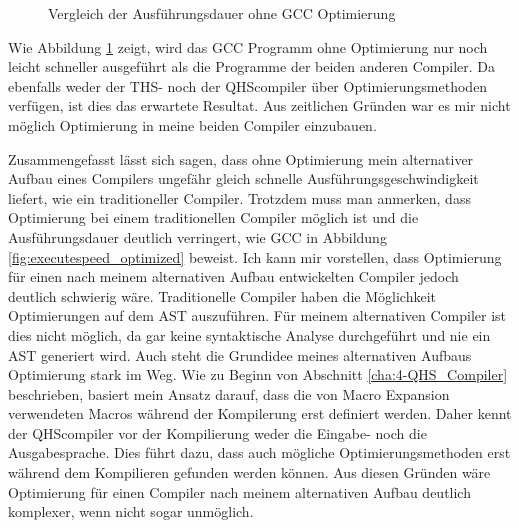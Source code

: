 \begin{figure}[H]
    \centering
    \label{fig:executespeed}
    \caption{Vergleich der Ausführungsdauer ohne GCC Optimierung}
\end{figure}

Wie Abbildung \ref{fig:executespeed} zeigt, wird das GCC Programm ohne Optimierung nur noch leicht schneller ausgeführt als die Programme der beiden anderen Compiler.
Da ebenfalls weder der THS- noch der QHScompiler über Optimierungsmethoden verfügen, ist dies das erwartete Resultat.
Aus zeitlichen Gründen war es mir nicht möglich Optimierung in meine beiden Compiler einzubauen.

Zusammengefasst lässt sich sagen, dass ohne Optimierung mein alternativer Aufbau eines Compilers ungefähr gleich schnelle Ausführungsgeschwindigkeit liefert, wie ein traditioneller Compiler.
Trotzdem muss man anmerken, dass Optimierung bei einem traditionellen Compiler möglich ist und die Ausführungsdauer deutlich verringert, wie GCC in Abbildung \ref{fig:executespeed_optimized} beweist.
Ich kann mir vorstellen, dass Optimierung für einen nach meinem alternativen Aufbau entwickelten Compiler jedoch deutlich schwierig wäre.
Traditionelle Compiler haben die Möglichkeit Optimierungen auf dem AST auszuführen. Für meinem alternativen Compiler ist dies nicht möglich, da gar keine syntaktische Analyse durchgeführt und nie ein AST generiert wird.
Auch steht die Grundidee meines alternativen Aufbaus Optimierung stark im Weg.
Wie zu Beginn von Abschnitt \ref{cha:4-QHS_Compiler} beschrieben, basiert mein Ansatz darauf, dass die von Macro Expansion verwendeten Macros während der Kompilerung erst definiert werden.
Daher kennt der QHScompiler vor der Kompilierung weder die Eingabe- noch die Ausgabesprache. Dies führt dazu, dass auch mögliche Optimierungsmethoden erst während dem Kompilieren gefunden werden können.
Aus diesen Gründen wäre Optimierung für einen Compiler nach meinem alternativen Aufbau deutlich komplexer, wenn nicht sogar unmöglich.


